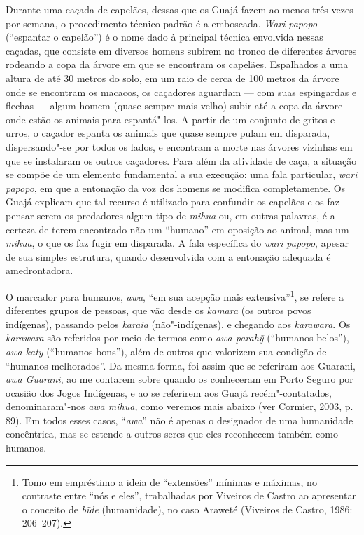 Durante uma caçada de capelães, dessas que os Guajá fazem ao menos três
vezes por semana, o procedimento técnico padrão é a emboscada.
\emph{Wari} \emph{papopo} (``espantar o capelão'') é o nome dado à
principal técnica envolvida nessas caçadas, que consiste em diversos
homens subirem no tronco de diferentes árvores rodeando a copa da árvore
em que se encontram os capelães. Espalhados a uma altura de até 30
metros do solo, em um raio de cerca de 100 metros da árvore onde se
encontram os macacos, os caçadores aguardam --- com suas espingardas e
flechas --- algum homem (quase sempre mais velho) subir até a copa da
árvore onde estão os animais para espantá"-los. A partir de um conjunto
de gritos e urros, o caçador espanta os animais que quase sempre pulam
em disparada, dispersando"-se por todos os lados, e encontram a morte nas
árvores vizinhas em que se instalaram os outros caçadores. Para além da
atividade de caça, a situação se compõe de um elemento fundamental a sua
execução: uma fala particular, \emph{wari papopo}, em que a entonação da
voz dos homens se modifica completamente. Os Guajá explicam que tal
recurso é utilizado para confundir os capelães e os faz pensar serem os
predadores algum tipo de \emph{mihua} ou, em outras palavras, é a
certeza de terem encontrado não um ``humano'' em oposição ao animal, mas
um \emph{mihua}, o que os faz fugir em disparada. A fala específica do
\emph{wari} \emph{papopo}, apesar de sua simples estrutura, quando
desenvolvida com a entonação adequada é amedrontadora.

O marcador para humanos, \emph{awa}, ``em sua acepção mais
extensiva''\footnote{Tomo em empréstimo a ideia de ``extensões'' mínimas e
  máximas, no contraste entre ``nós e eles'', trabalhadas por Viveiros de
  Castro ao apresentar o conceito de \emph{bĩde} (humanidade), no caso
  Araweté (Viveiros de Castro, 1986: 206--207).}, se refere a diferentes
grupos de pessoas, que vão desde os \emph{kamara} (os outros povos
indígenas), passando pelos \emph{karaia} (não"-indígenas), e chegando aos
\emph{karawara}. Os \emph{karawara} são referidos por meio de termos
como \emph{awa parahỹ} (``humanos belos''), \emph{awa katy} (``humanos
bons''), além de outros que valorizem sua condição de ``humanos
melhorados''. Da mesma forma, foi assim que se referiram aos Guarani,
\emph{awa Guarani}, ao me contarem sobre quando os conheceram em Porto
Seguro por ocasião dos Jogos Indígenas, e ao se referirem aos Guajá
recém"-contatados, denominaram"-nos \emph{awa mihua,} como veremos mais
abaixo (ver Cormier, 2003, p. 89). Em todos esses casos, ``\emph{awa}''
não é apenas o designador de uma humanidade concêntrica, mas se estende
a outros seres que eles reconhecem também como humanos.

